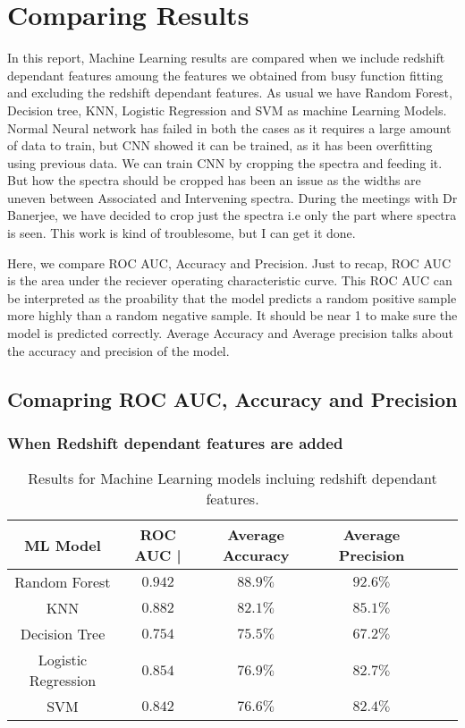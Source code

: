 \documentclass{report}
\begin{document}
\chapter{Comparing Results}

In this report, Machine Learning results are compared when we include redshift dependant features amoung the features we obtained from busy function fitting and excluding the redshift dependant features. As usual we have Random Forest, Decision tree, KNN, Logistic Regression and SVM as machine Learning Models. Normal Neural network has failed in both the cases as it requires a large amount of data to train, but CNN showed it can be trained, as it has been overfitting using previous data. We can train CNN by cropping the spectra and feeding it. But how the spectra should be cropped has been an issue as the widths are uneven between Associated and Intervening spectra. During the meetings with Dr Banerjee, we have decided to crop just the spectra i.e only the part where spectra is seen. This work is kind of troublesome, but I can get it done.

Here, we compare ROC AUC, Accuracy and Precision. Just to recap, ROC AUC is the area under the reciever operating characteristic curve. This ROC AUC can be interpreted as the proability that the model predicts a random positive sample more highly than a random negative sample. It should be near 1 to make sure the model is predicted correctly. Average Accuracy and Average precision talks about the accuracy and precision of the model.

\section{Comapring ROC AUC, Accuracy and Precision}
\subsection{When Redshift dependant features are added}
\begin{table}[h] 
  \centering
  \begin{tabular}{@{}cc@{}cc@{}cc@{}}
    \toprule
    ML Model & ROC AUC  | & Average Accuracy & Average Precision  \\
    \midrule
    Random Forest & $0.942$ & $88.9\%$ & $92.6\%$ \\
    KNN & $0.882$ & $82.1\%$ & $85.1\%$ \\
    Decision Tree & $0.754$ & $75.5\%$ & $67.2\%$ \\
    Logistic Regression & $0.854$ & $76.9\%$ & $82.7\%$ \\
    SVM & $0.842$ & $76.6\%$ & $82.4\%$ \\
    \bottomrule
  \end{tabular}
  \caption{Results for Machine Learning models incluing redshift dependant features.}
  \label{results_1}
\end{table}
\end{document}
